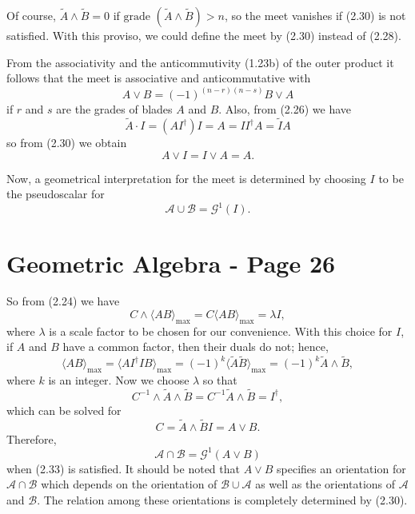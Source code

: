 \documentclass[fleqn]{scrartcl}
\numberwithin{equation}{section}
\begin{document}
\noindent Of course, \(\tilde{A} \wedge \tilde{B} = 0\) if \(\text{grade } (\tilde{A} \wedge \tilde{B}) > n\), so the meet vanishes if (2.30) is not satisfied. With this proviso, we could define the meet by (2.30) instead of (2.28).

\vspace{1em}
\noindent From the associativity and the anticommutivity (1.23b) of the outer product it follows that the meet is associative and anticommutative with
\begin{equation}
A \vee B = (-1)^{(n-r)(n-s)}B \vee A \tag{2.31}
\end{equation}
if \(r\) and \(s\) are the grades of blades \(A\) and \(B\). Also, from (2.26) we have
\[
\tilde{A} \cdot I = (AI^{\dagger})I = A = II^{\dagger}A = \tilde{I}A
\]
so from (2.30) we obtain
\begin{equation}
A \vee I = I \vee A = A. \tag{2.32}
\end{equation}

\vspace{1em}
\noindent Now, a geometrical interpretation for the meet is determined by choosing \(I\) to be the pseudoscalar for
\begin{equation}
\mathscr{A} \cup \mathscr{B} = \mathscr{G}^1(I). \tag{2.33}
\end{equation}

\section*{Geometric Algebra - Page 26}

\noindent So from (2.24) we have
\[
C \wedge \langle AB \rangle_{\text{max}} = C \langle AB \rangle_{\text{max}} = \lambda I,
\]
where \(\lambda\) is a scale factor to be chosen for our convenience. With this choice for \(I\), if \(A\) and \(B\) have a common factor, then their duals do not; hence,
\[
\langle AB \rangle_{\text{max}} = \langle AI^{\dagger}IB \rangle_{\text{max}} = (-1)^k \langle \tilde{A}\tilde{B} \rangle_{\text{max}} = (-1)^k \tilde{A} \wedge \tilde{B},
\]
where \(k\) is an integer. Now we choose \(\lambda\) so that
\[
C^{-1} \wedge \tilde{A} \wedge \tilde{B} = C^{-1} \tilde{A} \wedge \tilde{B} = I^{\dagger},
\]
which can be solved for
\[
C = \tilde{A} \wedge \tilde{B}I = A \vee B.
\]
Therefore,
\begin{equation}
\mathscr{A} \cap \mathscr{B} = \mathscr{G}^1(A \vee B) \tag{2.34}
\end{equation}
when (2.33) is satisfied. It should be noted that \(A \vee B\) specifies an orientation for \(\mathscr{A} \cap \mathscr{B}\) which depends on the orientation of \(\mathscr{B} \cup \mathscr{A}\) as well as the orientations of \(\mathscr{A}\) and \(\mathscr{B}\). The relation among these orientations is completely determined by (2.30).
\end{document}
